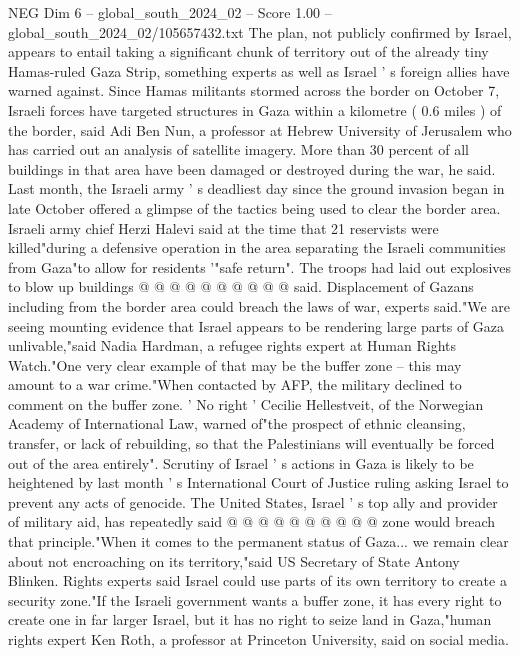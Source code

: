 \begin{textsample}{NEG Dim 6 – global\_south\_2024\_02 – Score 1.00 – global\_south\_2024\_02/105657432.txt}  \label{ex:f6_neg_273}
The plan, not publicly confirmed by Israel, appears to entail taking a significant chunk of territory out of the already tiny Hamas-ruled Gaza Strip, something experts as well as Israel ' s foreign allies have warned against.
Since Hamas militants stormed across the border on October 7, Israeli forces have targeted structures in Gaza within a kilometre ( 0.6 miles ) of the border, said Adi Ben Nun, a professor at Hebrew University of Jerusalem who has carried out an analysis of satellite imagery.
More than 30 percent of all buildings in that area have been damaged or destroyed during the war, he said.
Last month, the Israeli army ' s deadliest day since the ground invasion began in late October offered a glimpse of the tactics being used to clear the border area.
Israeli army chief Herzi Halevi said at the time that 21 reservists were killed"during a defensive operation in the area separating the Israeli communities from Gaza"to allow for residents '"safe return".
The troops had laid out explosives to blow up buildings @ @ @ @ @ @ @ @ @ @ said.
Displacement of Gazans including from the border area could breach the laws of war, experts said."We are seeing mounting evidence that Israel appears to be rendering large parts of Gaza unlivable,"said Nadia Hardman, a refugee rights expert at Human Rights Watch."One very clear example of that may be the buffer zone -- this may amount to a war crime."When contacted by AFP, the military declined to comment on the buffer zone. ' No right ' Cecilie Hellestveit, of the Norwegian Academy of International Law, warned of"the prospect of ethnic cleansing, transfer, or lack of rebuilding, so that the Palestinians will eventually be forced out of the area entirely".
Scrutiny of Israel ' s actions in Gaza is likely to be heightened by last month ' s International Court of Justice ruling asking Israel to prevent any acts of genocide.
The United States, Israel ' s top ally and provider of military aid, has repeatedly said @ @ @ @ @ @ @ @ @ @ zone would breach that principle."When it comes to the permanent status of Gaza... we remain clear about not encroaching on its territory,"said US Secretary of State Antony Blinken.
Rights experts said Israel could use parts of its own territory to create a security zone."If the Israeli government wants a buffer zone, it has every right to create one in far larger Israel, but it has no right to seize land in Gaza,"human rights expert Ken Roth, a professor at Princeton University, said on social media.

\end{textsample}
